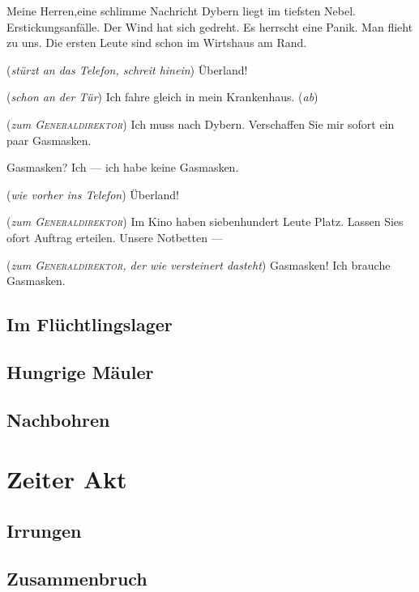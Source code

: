 \documentclass[
	final,
	a4paper,
	ngerman,
	mpinclude = true, %
	twoside = true,
	open = right,
	cleardoublepage = plain,
	DIV = 13,
	BCOR = 1cm,
	titlepage = firstiscover,
	]{scrbook}
\newcommand{\act}{\chapter}
\newcommand{\scene}{\setcounter{subscene}{1}\section}
\newcommand{\direction}[1]{(\textit{#1})}
\newcounter{subscene}
\newcommand{\thecharacter}[1]{\textup{\textsc{#1}}\xspace}
\newcommand{\theGeneraldirektor}{\thecharacter{Generaldirektor}}
\newcommand{\theAlexis}{\thecharacter{Alexis}}
\newcommand{\theThomsen}{\thecharacter{Thomsen}}
\newcommand{\theJonas}{\thecharacter{Jonas}}
\newcommand{\theSalwin}{\thecharacter{Salwin}}
\newcommand{\character}[1]{\item[#1]}
\newcommand{\Generaldirektor}{\character{Direktor}}
\newcommand{\Alexis}{\character{\theAlexis}}
\newcommand{\Thomsen}{\character{\theThomsen}}
\newcommand{\Jonas}{\character{\theJonas}}
\newcommand{\Salwin}{\character{\theSalwin}}
\begin{document}
\begin{play}
Meine Herren,eine schlimme Nachricht Dybern liegt im tiefsten Nebel. Erstickungsanfälle. Der Wind hat sich gedreht. Es herrscht eine Panik. Man flieht zu uns. Die ersten Leute sind schon im Wirtshaus am Rand.

\Salwin
\direction{stürzt an das Telefon, schreit hinein} Überland!

\Thomsen
\direction{schon an der Tür} Ich fahre gleich in mein Krankenhaus. \direction{ab}

\Jonas
\direction{zum \theGeneraldirektor} Ich muss nach Dybern. Verschaffen Sie mir sofort ein paar Gasmasken.

\Generaldirektor
Gasmasken? Ich --- ich habe keine Gasmasken.

\Salwin
\direction{wie vorher ins Telefon} Überland!

\Alexis
\direction{zum \theGeneraldirektor} Im Kino haben siebenhundert Leute Platz. Lassen Sies ofort Auftrag erteilen. Unsere Notbetten ---

\Jonas
\direction{zum \theGeneraldirektor, der wie versteinert dasteht} Gasmasken! Ich brauche Gasmasken.
\end{play}



\scene{Im Flüchtlingslager}
\scene{Hungrige Mäuler}
\scene{Nachbohren}

\act{Zeiter Akt}
\scene{Irrungen}
\scene{Zusammenbruch}
\end{document}

